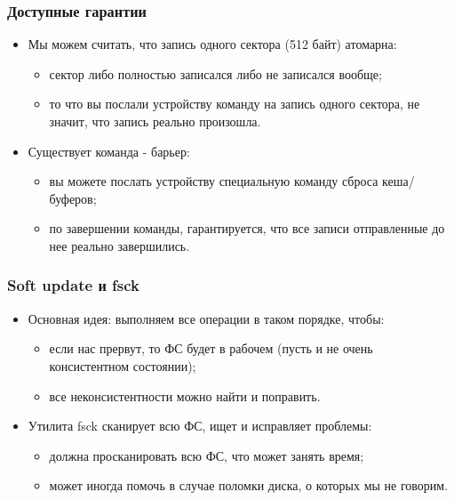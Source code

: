 \begin{frame}
\frametitle{Доступные гарантии}
\begin{itemize}
  \item Мы можем считать, что запись одного сектора (512 байт) атомарна:
  \begin{itemize}
    \item сектор либо полностью записался либо не записался вообще;
    \item то что вы послали устройству команду на запись одного сектора, не
    значит, что запись реально произошла.
  \end{itemize}
  \item Существует команда - барьер:
  \begin{itemize}
    \item вы можете послать устройству специальную команду сброса кеша/буферов;
    \item по завершении команды, гарантируется, что все записи отправленные до
    нее реально завершились.
  \end{itemize}
\end{itemize}
\end{frame}

\begin{frame}
\frametitle{Soft update и fsck}
\begin{itemize}
  \item Основная идея: выполняем все операции в таком порядке, чтобы:
  \begin{itemize}
    \item если нас прервут, то ФС будет в рабочем (пусть и не очень
    консистентном состоянии);
    \item все неконсистентности можно найти и поправить.
  \end{itemize}
  \item Утилита fsck сканирует всю ФС, ищет и исправляет проблемы:
  \begin{itemize}
    \item должна просканировать всю ФС, что может занять время;
    \item может иногда помочь в случае поломки диска, о которых мы не говорим.
  \end{itemize}
\end{itemize}
\end{frame}

